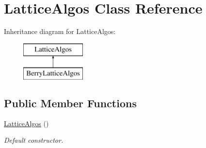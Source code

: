\hypertarget{class_lattice_algos}{
\section{LatticeAlgos Class Reference}
\label{class_lattice_algos}
}
Inheritance diagram for LatticeAlgos:\begin{figure}[H]
\begin{center}
\leavevmode
\includegraphics[height=2.000000cm]{class_lattice_algos}
\end{center}
\end{figure}
\subsection*{Public Member Functions}
\begin{DoxyCompactItemize}
\item 
\hypertarget{class_lattice_algos_ae3f96fdf1928948a830de0ec273534c1}{
\hyperlink{class_lattice_algos_ae3f96fdf1928948a830de0ec273534c1}{LatticeAlgos} ()}
\label{class_lattice_algos_ae3f96fdf1928948a830de0ec273534c1}

\begin{DoxyCompactList}\small\item\em Default constructor. \item\end{DoxyCompactList}\end{DoxyCompactItemize}
